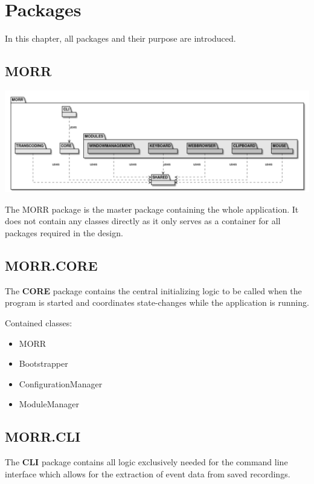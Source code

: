 \chapter{Packages}
\label{ch:package}

In this chapter, all packages and their purpose are introduced.

\section{MORR}

\begin{center}
    \includegraphics[width=1.0\textwidth]{resources/Packages/AllPackages.png}
\end{center}

The MORR package is the master package containing the whole application. It does not contain any classes directly as it only serves as a container for all packages required in the design.

\newpage
\section{MORR.CORE}

The \textbf{CORE} package contains the central initializing logic to be called when the program is started and coordinates state-changes while the application is running.

Contained classes:
\begin{itemize}
\item MORR 
\item Bootstrapper
\item ConfigurationManager
\item ModuleManager
\end{itemize}

\newpage
\section{MORR.CLI}

The \textbf{CLI} package contains all logic exclusively needed for the command line interface which allows for the extraction of event data from saved recordings.

